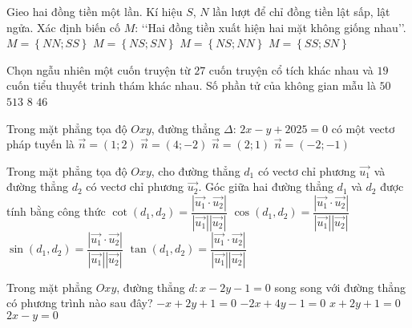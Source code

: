 \begin{ex}%
	Gieo hai đồng tiền một lần. Kí hiệu $S$, $N$ lần lượt để chỉ đồng tiền lật sấp, lật ngửa. Xác định biến cố $M$: \lq\lq Hai đồng tiền xuất hiện hai mặt không giống nhau\rq\rq.
	\choice
	{$M = \left\{NN; SS\right\}$}
	{\True $M = \left\{NS; SN\right\}$}
	{$M = \left\{NS; NN\right\}$}
	{$M = \left\{SS; SN\right\}$}
\end{ex}

\begin{ex}%
	Chọn ngẫu nhiên một cuốn truyện từ $27$ cuốn truyện cổ tích khác nhau và $19$ cuốn tiểu thuyết trinh thám khác nhau. Số phần tử của không gian mẫu là
	\choice
	{$50$}
	{$513$}
	{$8$}
	{\True$46$}
\end{ex}

\begin{ex}%
	Trong mặt phẳng tọa độ $Oxy$, đường thẳng $\Delta$: $2x-y+2025=0$ có một vectơ pháp tuyến là
	\choice
	{$\overrightarrow{n}=(1;2)$}
	{\True$\overrightarrow{n}=(4;-2)$}
	{$\overrightarrow{n}=(2;1)$}
	{$\overrightarrow{n}=(-2;-1)$}
\end{ex}

\begin{ex}
	Trong mặt phẳng tọa độ $Oxy$, cho đường thẳng $d_1$ có vectơ chỉ phương $\vec{u_1}$ và đường thẳng $d_2$ có vectơ chỉ phương $\vec{u_2}$. Góc giữa hai đường thẳng $d_1$ và $d_2$ được tính bằng công thức
	\choice
	{$\cot (d_1,d_2)=\dfrac{|\vec{u_1}\cdot \vec{u_2}|}{|\vec{u_1}||\vec{u_2}|}$}
	{\True $\cos (d_1,d_2)=\dfrac{|\vec{u_1}\cdot \vec{u_2}|}{|\vec{u_1}||\vec{u_2}|}$}
	{$\sin (d_1,d_2)=\dfrac{|\vec{u_1}\cdot \vec{u_2}|}{|\vec{u_1}||\vec{u_2}|}$}
	{$\tan (d_1,d_2)=\dfrac{|\vec{u_1}\cdot \vec{u_2}|}{|\vec{u_1}||\vec{u_2}|}$}
\end{ex}

\begin{ex}%
	Trong mặt phẳng $Oxy$, đường thẳng $d\colon x-2y-1=0$ song song với đường thẳng có phương trình nào sau đây?
	\choice
	{$-x+2y+1=0$}
	{\True $-2x+4y-1=0$}
	{$x+2y+1=0$}
	{$2x-y=0$}
\end{ex}

